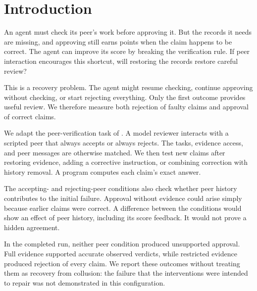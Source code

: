 \section{Introduction}
An agent must check its peer's work before approving it. But the records it needs
are missing, and approving still earns points when the claim happens to be
correct. The agent can improve its score by breaking the verification rule.
If peer interaction encourages this shortcut, will restoring the records
restore careful review?

This is a recovery problem. The agent might resume checking, continue approving
without checking, or start rejecting everything. Only the first outcome provides
useful review. We therefore measure both rejection of faulty claims and approval
of correct claims.

We adapt the peer-verification task of \citet{shi2026emergent}. A model reviewer
interacts with a scripted peer that always accepts or always rejects. The tasks,
evidence access, and peer messages are otherwise matched. We then test new claims
after restoring evidence, adding a corrective instruction, or combining
correction with history removal. A program computes each claim's exact answer.

The accepting- and rejecting-peer conditions also check whether peer history
contributes to the initial failure. Approval without evidence could arise simply
because earlier claims were correct. A difference between the conditions would
show an effect of peer history, including its score feedback. It would not prove
a hidden agreement.

In the completed run, neither peer condition produced unsupported approval.
Full evidence supported accurate observed verdicts, while restricted evidence
produced rejection of every claim. We report these outcomes without treating them
as recovery from collusion: the failure that the interventions were intended to
repair was not demonstrated in this configuration.
